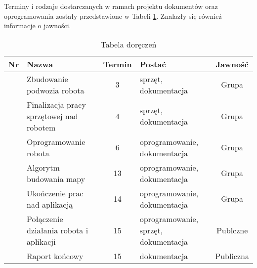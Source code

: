 
Terminy i rodzaje dostarczanych w ramach projektu dokumentów oraz oprogramowania zostały przedstawione w Tabeli \ref{tabela_doreczenie}. Znalazły się również informacje o jawności.


\newcommand\rownumber{\stepcounter{rownumbercounter}\arabic{rownumbercounter}}

\begin{table}[h]
	\centering
	\begin{tabularx}{\linewidth}{|c|X|c|X|c|}
		\hline 
		Nr & Nazwa & Termin & Postać & Jawność \\ \hline
		 \rownumber & Zbudowanie podwozia robota & 3 & sprzęt, dokumentacja & Grupa \\ \hline
		 \rownumber & Finalizacja pracy sprzętowej nad robotem & 4 & sprzęt, dokumentacja & Grupa \\ \hline
		 \rownumber & Oprogramowanie robota & 6 & oprogramowanie, dokumentacja & Grupa \\ \hline
		 \rownumber & Algorytm budowania mapy & 13 & oprogramowanie, dokumentacja & Grupa \\ \hline
		 \rownumber & Ukończenie prac nad aplikacją & 14 & oprogramowanie, dokumentacja & Grupa \\ \hline
		 \rownumber & Połączenie działania robota i aplikacji & 15 & oprogramowanie, sprzęt, dokumentacja & Publczne \\ \hline
		 \rownumber & Raport końcowy & 15 & dokumentacja & Publiczna \\ \hline
		 
	\end{tabularx}
	\caption{Tabela doręczeń}
	\label{tabela_doreczenie}
\end{table}
